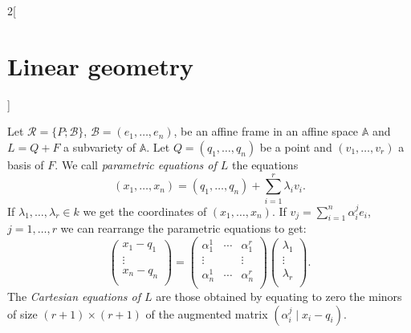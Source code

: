\documentclass[class=article,10pt,crop=false]{standalone}
\begin{document}
\begin{multicols}{2}[\section{Linear geometry}]
\begin{definition}
Let $\mathcal{R}=\{P;\mathcal{B}\}$, $\mathcal{B}=(e_1,\ldots,e_n)$, be an affine frame in an affine space $\mathbb{A}$ and $L=Q+F$ a subvariety of $\mathbb{A}$. Let $Q=(q_1,\ldots,q_n)$ be a point and $(v_1,\ldots,v_r)$ a basis of $F$. We call \textit{parametric equations of $L$} the equations $$(x_1,\ldots,x_n)=(q_1,\ldots,q_n)+\sum_{i=1}^r\lambda_iv_i.$$ If $\lambda_1,\ldots,\lambda_r\in k$ we get the coordinates of $(x_1,\ldots,x_n)$. If $\displaystyle v_j=\sum_{i=1}^n\alpha_i^je_i$, $j=1,\ldots,r$ we can rearrange the parametric equations to get: $$\begin{pmatrix}
x_1-q_1 \\
\vdots \\
x_n-q_n \\
\end{pmatrix}=\begin{pmatrix}
\alpha_1^1 & \cdots & \alpha_1^r \\
\vdots & & \vdots \\
\alpha_n^1 & \cdots & \alpha_n^r \\
\end{pmatrix}\begin{pmatrix}
\lambda_1 \\
\vdots \\
\lambda_r \\
\end{pmatrix}.$$ The \textit{Cartesian equations of $L$} are those obtained by equating to zero the minors of size $(r+1)\times(r+1)$ of the augmented matrix $\left(\alpha_i^j\mid x_i-q_i\right)$.
\end{definition}

\end{multicols}
\end{document}
